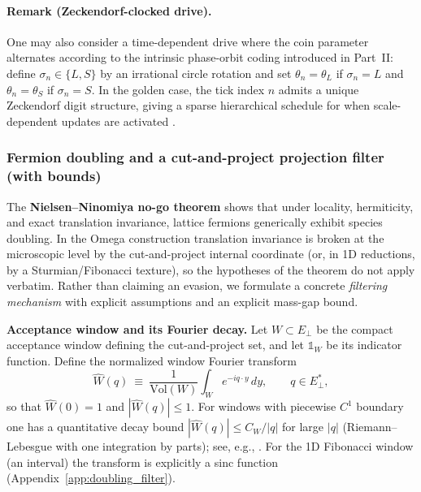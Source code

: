 \paragraph{Remark (Zeckendorf-clocked drive).}
One may also consider a time-dependent drive where the coin parameter alternates according to the intrinsic phase-orbit coding introduced in Part~II: define $\sigma_n\in\{L,S\}$ by an irrational circle rotation and set $\theta_n=\theta_L$ if $\sigma_n=L$ and $\theta_n=\theta_S$ if $\sigma_n=S$. In the golden case, the tick index $n$ admits a unique Zeckendorf digit structure, giving a sparse hierarchical schedule for when scale-dependent updates are activated \cite{Zeckendorf1972,AlloucheShallit2003}.

\subsubsection{Fermion doubling and a cut-and-project projection filter (with bounds)}
\label{sec:doubling_filter}
The \textbf{Nielsen--Ninomiya no-go theorem} \cite{Nielsen1981} shows that under locality, hermiticity, and exact translation invariance, lattice fermions generically exhibit species doubling. In the Omega construction translation invariance is broken at the microscopic level by the cut-and-project internal coordinate (or, in 1D reductions, by a Sturmian/Fibonacci texture), so the hypotheses of the theorem do not apply verbatim.
Rather than claiming an evasion, we formulate a concrete \emph{filtering mechanism} with explicit assumptions and an explicit mass-gap bound.\par

\noindent\textbf{Acceptance window and its Fourier decay.}
Let $W\subset E_\perp$ be the compact acceptance window defining the cut-and-project set, and let $\mathds{1}_W$ be its indicator function. Define the normalized window Fourier transform
\begin{equation}
    \widehat{W}(q)\ \equiv\ \frac{1}{\mathrm{Vol}(W)}\int_W e^{-i q\cdot y}\,dy,\qquad q\in E_\perp^*,
\end{equation}
so that $\widehat{W}(0)=1$ and $|\widehat{W}(q)|\le 1$.
For windows with piecewise $C^1$ boundary one has a quantitative decay bound $|\widehat{W}(q)|\le C_W/|q|$ for large $|q|$ (Riemann--Lebesgue with one integration by parts); see, e.g., \cite{SteinShakarchi2003FourierAnalysis,BaakeGrimm2013AperiodicOrder}. For the 1D Fibonacci window (an interval) the transform is explicitly a sinc function (Appendix~\ref{app:doubling_filter}).\par

